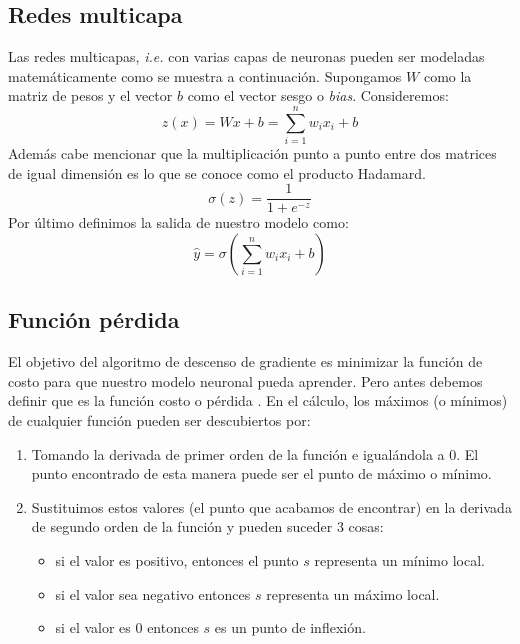 \documentclass[a4paper,12pt]{article}
\begin{document}
\subsection{Redes multicapa}
Las redes multicapas, \textit{i.e.} con varias capas de neuronas pueden ser modeladas matemáticamente como se muestra a continuación.
Supongamos $W$ como la matriz de pesos y el vector $b$ como el vector sesgo o \textit{bias}.
Consideremos:
\begin{equation}
	z(x)=Wx+b=\sum_{i=1}^{n}w_ix_i+b
\end{equation}
Además cabe mencionar que la multiplicación punto a punto entre dos matrices de igual dimensión es lo que se conoce como el producto Hadamard.
\begin{equation}
	\sigma(z)=\frac{1}{1+e^{-z}}
\end{equation}
Por último definimos la salida de nuestro modelo como:
\begin{equation}
	\hat{y}=\sigma(\sum_{i=1}^{n}w_ix_i+b)
\end{equation}

\subsection{Función pérdida}

El objetivo del algoritmo de descenso de gradiente es minimizar la función de costo para que nuestro modelo neuronal pueda aprender.
Pero antes debemos definir que es la función costo o pérdida \cite{sgd}.
En el cálculo, los máximos (o mínimos) de cualquier función pueden ser descubiertos por:
\begin{enumerate}[noitemsep, topsep=2pt]
	\item Tomando la derivada de primer orden de la función e igualándola a 0. El punto encontrado de esta manera puede ser el punto de máximo o mínimo.
	\item Sustituimos estos valores (el punto que acabamos de encontrar) en la derivada de segundo orden de la función y pueden suceder 3 cosas:
	      \begin{itemize}
	      	\item si el valor es positivo, entonces el punto $s$ representa un mínimo local.
	      	\item si el valor sea negativo entonces $s$ representa un máximo local.
	      	\item si el valor es $0$ entonces $s$ es un punto de inflexión.
	      \end{itemize}
\end{enumerate}
\end{document}

